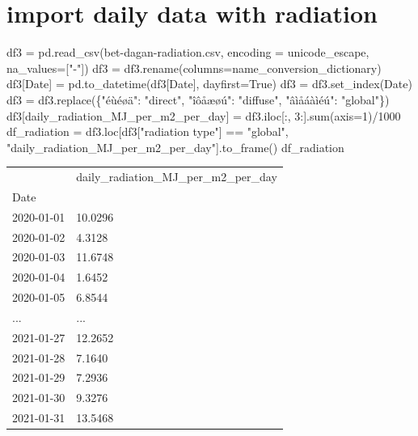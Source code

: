 \documentclass[
  letterpaper,
  DIV=11,
  numbers=noendperiod]{scrreprt}
\newenvironment{Shaded}{\begin{snugshade}}{\end{snugshade}}
\newcommand{\BuiltInTok}[1]{\textcolor[rgb]{0.00,0.23,0.31}{#1}}
\newcommand{\DecValTok}[1]{\textcolor[rgb]{0.68,0.00,0.00}{#1}}
\newcommand{\NormalTok}[1]{\textcolor[rgb]{0.00,0.23,0.31}{#1}}
\newcommand{\OperatorTok}[1]{\textcolor[rgb]{0.37,0.37,0.37}{#1}}
\newcommand{\StringTok}[1]{\textcolor[rgb]{0.13,0.47,0.30}{#1}}
\newcommand{\VariableTok}[1]{\textcolor[rgb]{0.07,0.07,0.07}{#1}}
\begin{document}
\hypertarget{import-daily-data-with-radiation}{%
\section{import daily data with
radiation}\label{import-daily-data-with-radiation}}

\begin{Shaded}
\begin{Highlighting}[]
\NormalTok{df3 }\OperatorTok{=}\NormalTok{ pd.read\_csv(}\StringTok{\textquotesingle{}bet{-}dagan{-}radiation.csv\textquotesingle{}}\NormalTok{, encoding }\OperatorTok{=} \StringTok{\textquotesingle{}unicode\_escape\textquotesingle{}}\NormalTok{, na\_values}\OperatorTok{=}\NormalTok{[}\StringTok{"{-}"}\NormalTok{])}
\NormalTok{df3 }\OperatorTok{=}\NormalTok{ df3.rename(columns}\OperatorTok{=}\NormalTok{name\_conversion\_dictionary)}
\NormalTok{df3[}\StringTok{\textquotesingle{}Date\textquotesingle{}}\NormalTok{] }\OperatorTok{=}\NormalTok{ pd.to\_datetime(df3[}\StringTok{\textquotesingle{}Date\textquotesingle{}}\NormalTok{], dayfirst}\OperatorTok{=}\VariableTok{True}\NormalTok{)}
\NormalTok{df3 }\OperatorTok{=}\NormalTok{ df3.set\_index(}\StringTok{\textquotesingle{}Date\textquotesingle{}}\NormalTok{)}
\NormalTok{df3 }\OperatorTok{=}\NormalTok{ df3.replace(\{}\StringTok{"éùéøä"}\NormalTok{: }\StringTok{"direct"}\NormalTok{,}
                   \StringTok{"îôåæøú"}\NormalTok{: }\StringTok{"diffuse"}\NormalTok{,}
                   \StringTok{"âìåáàìéú"}\NormalTok{: }\StringTok{"global"}\NormalTok{\})}
\NormalTok{df3[}\StringTok{\textquotesingle{}daily\_radiation\_MJ\_per\_m2\_per\_day\textquotesingle{}}\NormalTok{] }\OperatorTok{=}\NormalTok{ df3.iloc[:, }\DecValTok{3}\NormalTok{:].}\BuiltInTok{sum}\NormalTok{(axis}\OperatorTok{=}\DecValTok{1}\NormalTok{)}\OperatorTok{/}\DecValTok{1000}
\NormalTok{df\_radiation }\OperatorTok{=}\NormalTok{ df3.loc[df3[}\StringTok{"radiation type"}\NormalTok{] }\OperatorTok{==} \StringTok{"global"}\NormalTok{, }\StringTok{"daily\_radiation\_MJ\_per\_m2\_per\_day"}\NormalTok{].to\_frame()}
\NormalTok{df\_radiation}
\end{Highlighting}
\end{Shaded}

\begin{longtable}[]{@{}ll@{}}
\toprule()
& daily\_radiation\_MJ\_per\_m2\_per\_day \\
Date & \\
\midrule()
\endhead
2020-01-01 & 10.0296 \\
2020-01-02 & 4.3128 \\
2020-01-03 & 11.6748 \\
2020-01-04 & 1.6452 \\
2020-01-05 & 6.8544 \\
... & ... \\
2021-01-27 & 12.2652 \\
2021-01-28 & 7.1640 \\
2021-01-29 & 7.2936 \\
2021-01-30 & 9.3276 \\
2021-01-31 & 13.5468 \\
\bottomrule()
\end{longtable}
\end{document}
